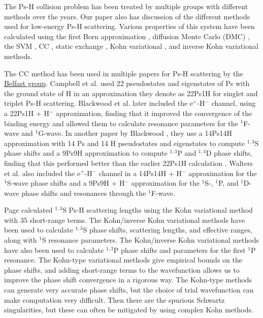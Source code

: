 \documentclass[Dissertation.tex]{subfiles}
\begin{document}
The Ps-H collision problem has been treated by multiple groups with different
methods over the years. %
Our paper \cite{Woods2015} also has discussion of the different methods used
for low-energy Ps-H scattering. Various properties of this system have been
calculated using the first Born approximation \cite{Massey1954,McAlinden1996},
diffusion Monte Carlo (DMC)
\cite{Chiesa2002}, the SVM \cite{Ivanov2001,Ivanov2002}, CC
\cite{Sinha1997,Campbell1998,Adhikari1999,Sinha2000,Blackwood2002,Blackwood2002b,Walters2004},
static exchange \cite{Hara1975,Ray1996,Ray1997}, Kohn variational
\cite{Page1976,VanReeth2003,VanReeth2004}, and inverse Kohn
variational \cite{VanReeth2003,VanReeth2004} methods.

The CC method has been used in multiple papers for Ps-H scattering by the
\href{http://web.am.qub.ac.uk/ctamop/people.php}{Belfast group}. Campbell et
al. \cite{Campbell1998} used 22 pseudostates and eigenstates of Ps with the
ground state of H in an approximation they denote as 22Ps1H for singlet and
triplet Ps-H scattering. Blackwood et al. \cite{Blackwood2002b} later included
the e$^+$-H$^-$ channel, using a 22Ps1H + H$^-$ approximation, finding that it
improved the convergence of the binding energy and allowed them to calculate
resonance parameters for the $^1$F-wave and $^1$G-wave. In another paper by
Blackwood \cite{Blackwood2002}, they use a 14Ps14H approximation with
14 Ps and 14 H pseudostates and eigenstates to compute
$^{1,3}$S phase shifts and a 9Ps9H approximation to compute $^{1,3}$P and
$^{1,3}$D phase shifts, finding that this performed better than the
earlier 22Ps1H calculation \cite{Campbell1998}. Walters et al.
\cite{Walters2004} also included the e$^+$-H$^-$ channel in a 14Ps14H + H$^-$
approximation for the $^1$S-wave phase shifts and a 9Ps9H + H$^-$ approximation
for the $^1$S-, $^1$P, and $^1$D-wave phase shifts and resonances through the
$^1$F-wave.

Page \cite{Page1976} calculated $^{1,3}$S Ps-H scattering lengths using the
Kohn variational method with 35 short-range terms. The Kohn/inverse Kohn
variational methods \cite{VanReeth2003,VanReeth2004} have been used to calculate
$^{1,3}$S phase shifts, scattering lengths, and effective ranges, along with
$^1$S resonance parameters. The Kohn/inverse Kohn variational methods
\cite{VanReeth2004} have also been used to calculate $^{1,3}$P phase shifts
and parameters for the first $^1$P resonance. The Kohn-type variational methods
give empirical bounds on the phase shifts, and adding short-range terms to the
wavefunction allows us to improve the phase shift convergence in a rigorous way.
The Kohn-type methods can generate very accurate 
phase shifts, but the choice of trial wavefunction can make computation very 
difficult. Then there are the spurious Schwartz singularities, but these can 
often be mitigated by using complex Kohn methods.
\end{document}
